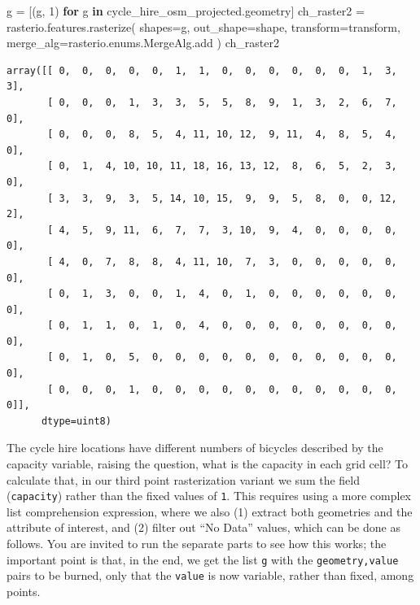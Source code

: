 \documentclass[
  letterpaper,
]{krantz}
\newenvironment{Shaded}{\begin{snugshade}}{\end{snugshade}}
\newcommand{\ControlFlowTok}[1]{\textcolor[rgb]{0.00,0.23,0.31}{\textbf{#1}}}
\newcommand{\DecValTok}[1]{\textcolor[rgb]{0.68,0.00,0.00}{#1}}
\newcommand{\KeywordTok}[1]{\textcolor[rgb]{0.00,0.23,0.31}{\textbf{#1}}}
\newcommand{\NormalTok}[1]{\textcolor[rgb]{0.00,0.23,0.31}{#1}}
\newcommand{\OperatorTok}[1]{\textcolor[rgb]{0.37,0.37,0.37}{#1}}
\begin{document}
\begin{Shaded}
\begin{Highlighting}[]
\NormalTok{g }\OperatorTok{=}\NormalTok{ [(g, }\DecValTok{1}\NormalTok{) }\ControlFlowTok{for}\NormalTok{ g }\KeywordTok{in}\NormalTok{ cycle\_hire\_osm\_projected.geometry]}
\NormalTok{ch\_raster2 }\OperatorTok{=}\NormalTok{ rasterio.features.rasterize(}
\NormalTok{    shapes}\OperatorTok{=}\NormalTok{g,}
\NormalTok{    out\_shape}\OperatorTok{=}\NormalTok{shape,}
\NormalTok{    transform}\OperatorTok{=}\NormalTok{transform,}
\NormalTok{    merge\_alg}\OperatorTok{=}\NormalTok{rasterio.enums.MergeAlg.add}
\NormalTok{)}
\NormalTok{ch\_raster2}
\end{Highlighting}
\end{Shaded}

\begin{verbatim}
array([[ 0,  0,  0,  0,  0,  1,  1,  0,  0,  0,  0,  0,  0,  1,  3,  3],
       [ 0,  0,  0,  1,  3,  3,  5,  5,  8,  9,  1,  3,  2,  6,  7,  0],
       [ 0,  0,  0,  8,  5,  4, 11, 10, 12,  9, 11,  4,  8,  5,  4,  0],
       [ 0,  1,  4, 10, 10, 11, 18, 16, 13, 12,  8,  6,  5,  2,  3,  0],
       [ 3,  3,  9,  3,  5, 14, 10, 15,  9,  9,  5,  8,  0,  0, 12,  2],
       [ 4,  5,  9, 11,  6,  7,  7,  3, 10,  9,  4,  0,  0,  0,  0,  0],
       [ 4,  0,  7,  8,  8,  4, 11, 10,  7,  3,  0,  0,  0,  0,  0,  0],
       [ 0,  1,  3,  0,  0,  1,  4,  0,  1,  0,  0,  0,  0,  0,  0,  0],
       [ 0,  1,  1,  0,  1,  0,  4,  0,  0,  0,  0,  0,  0,  0,  0,  0],
       [ 0,  1,  0,  5,  0,  0,  0,  0,  0,  0,  0,  0,  0,  0,  0,  0],
       [ 0,  0,  0,  1,  0,  0,  0,  0,  0,  0,  0,  0,  0,  0,  0,  0]],
      dtype=uint8)
\end{verbatim}

The cycle hire locations have different numbers of bicycles described by
the capacity variable, raising the question, what is the capacity in
each grid cell? To calculate that, in our third point rasterization
variant we sum the field
(\texttt{\textquotesingle{}capacity\textquotesingle{}}) rather than the
fixed values of \texttt{1}. This requires using a more complex list
comprehension expression, where we also (1) extract both geometries and
the attribute of interest, and (2) filter out ``No Data'' values, which
can be done as follows. You are invited to run the separate parts to see
how this works; the important point is that, in the end, we get the list
\texttt{g} with the \texttt{geometry,value} pairs to be burned, only
that the \texttt{value} is now variable, rather than fixed, among
points.
\end{document}
